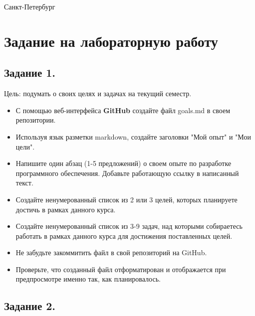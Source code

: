 \documentclass[12pt]{article}
\begin{document}


\vspace{\baselineskip}
\vspace{\baselineskip}
\vspace{\baselineskip}
\vspace{\baselineskip}
\vspace{\baselineskip}
\begin{Center}
Санкт-Петербург \the\year{}
\end{Center}\par
\newpage

\section{Задание на лабораторную работу}

\subsection{Задание 1.}
 

Цель: подумать о своих целях и задачах на текущий семестр.
\begin{itemize}
\item С помощью веб-интерфейса \textbf{GitHub} 
создайте файл goals.md в своем репозитории.
\item Используя язык разметки markdown, создайте заголовки "Мой опыт" и "Мои цели".
\item Напишите один абзац (1-5 предложений) о своем опыте по разработке программного обеспечения. Добавьте работающую ссылку в написанный текст.
\item Создайте ненумерованный список из 2 или 3 целей, которых планируете достичь в рамках данного курса.
\item Создайте ненумерованный список из 3-9 задач, над которыми собираетесь работать в рамках данного курса для достижения поставленных целей.
\item Не забудьте закоммитить файл в свой репозиторий на GitHub.
\item Проверьте, что созданный файл отформатирован и отображается при предпросмотре именно так, как планировалось.
\end{itemize}

\subsection{Задание 2.}
\end{document}
